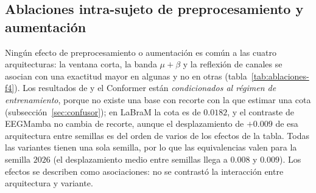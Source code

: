 \subsection{Ablaciones intra-sujeto de preprocesamiento y aumentación}
\label{sec:ablaciones-f4}

Ningún efecto de preprocesamiento o aumentación es común a las cuatro arquitecturas: la ventana corta, la
banda $\mu+\beta$ y la reflexión de canales se asocian con una exactitud mayor en algunas y no en otras
(tabla~\ref{tab:ablaciones-f4}). Los resultados de \eegnet{} y el Conformer están \emph{condicionados al
régimen de entrenamiento}, porque no existe una base con recorte con la que estimar una cota
(subsección~\ref{sec:confusor}); en LaBraM la cota es de $0.0182$, y el contraste de EEGMamba no cambia de
recorte, aunque el desplazamiento de $+0.009$ de esa arquitectura entre semillas es del orden de varios
de los efectos de la tabla. Todas las variantes tienen una sola semilla, por lo que las equivalencias valen
para la semilla $2026$ (el desplazamiento medio entre semillas llega a $0.008$ y $0.009$). Los efectos se
describen como asociaciones: no se contrastó la interacción entre arquitectura y variante.


